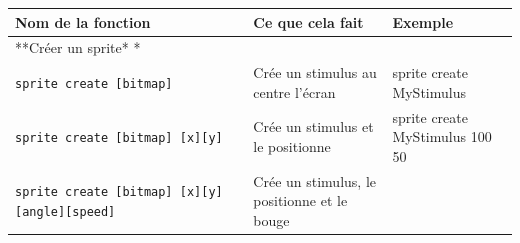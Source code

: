 \documentclass[
]{book}
\begin{document}
\begin{longtable}[]{@{}lll@{}}
\toprule
\begin{minipage}[b]{0.40\columnwidth}\raggedright
Nom de la fonction\strut
\end{minipage} & \begin{minipage}[b]{0.25\columnwidth}\raggedright
Ce que cela fait\strut
\end{minipage} & \begin{minipage}[b]{0.25\columnwidth}\raggedright
Exemple\strut
\end{minipage}\tabularnewline
\midrule
\endhead
\begin{minipage}[t]{0.40\columnwidth}\raggedright
**Créer un sprite* *\strut
\end{minipage} & \begin{minipage}[t]{0.25\columnwidth}\raggedright
\strut
\end{minipage} & \begin{minipage}[t]{0.25\columnwidth}\raggedright
\strut
\end{minipage}\tabularnewline
\begin{minipage}[t]{0.40\columnwidth}\raggedright
\texttt{sprite\ create\ {[}bitmap{]}}\strut
\end{minipage} & \begin{minipage}[t]{0.25\columnwidth}\raggedright
Crée un stimulus au centre l'écran\strut
\end{minipage} & \begin{minipage}[t]{0.25\columnwidth}\raggedright
sprite create MyStimulus\strut
\end{minipage}\tabularnewline
\begin{minipage}[t]{0.40\columnwidth}\raggedright
\texttt{sprite\ create\ {[}bitmap{]}\ {[}x{]}{[}y{]}}\strut
\end{minipage} & \begin{minipage}[t]{0.25\columnwidth}\raggedright
Crée un stimulus et le positionne\strut
\end{minipage} & \begin{minipage}[t]{0.25\columnwidth}\raggedright
sprite create MyStimulus 100 50\strut
\end{minipage}\tabularnewline
\begin{minipage}[t]{0.40\columnwidth}\raggedright
\texttt{sprite\ create\ {[}bitmap{]}\ {[}x{]}{[}y{]}{[}angle{]}{[}speed{]}}\strut
\end{minipage} & \begin{minipage}[t]{0.25\columnwidth}\raggedright
Crée un stimulus, le positionne et le bouge\strut

\end{minipage}
\end{longtable}
\end{document}
